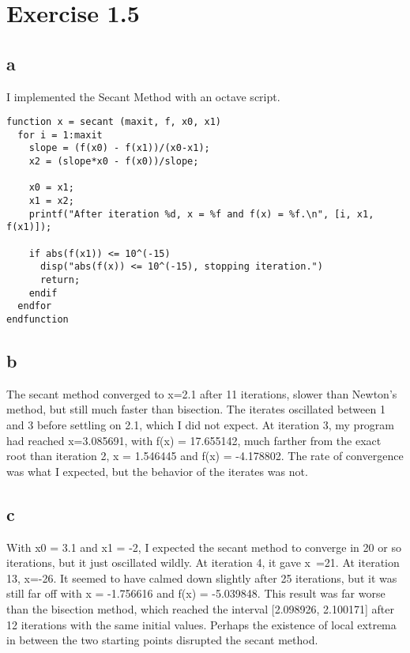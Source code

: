 \documentclass[11pt]{amsart}
\begin{document}
   \section{Exercise 1.5}
   \subsection{a}
   I implemented the Secant Method with an octave script.\\
   \begin{verbatim}
function x = secant (maxit, f, x0, x1)
  for i = 1:maxit
    slope = (f(x0) - f(x1))/(x0-x1);
    x2 = (slope*x0 - f(x0))/slope;

    x0 = x1;
    x1 = x2;
    printf("After iteration %d, x = %f and f(x) = %f.\n", [i, x1, f(x1)]);

    if abs(f(x1)) <= 10^(-15)
      disp("abs(f(x)) <= 10^(-15), stopping iteration.")
      return;
    endif
  endfor
endfunction
   \end{verbatim}
   \subsection{b}
   The secant method converged to x=2.1 after 11 iterations, slower than Newton's method, but still much faster than bisection.  The iterates oscillated between 1 and 3 before settling on 2.1, which I did not expect.  At iteration 3, my program had reached x=3.085691, with f(x) = 17.655142, much farther from the exact root than iteration 2, x = 1.546445 and f(x) = -4.178802.  The rate of convergence was what I expected, but the behavior of the iterates was not.
   \subsection{c}
   With x0 = 3.1 and x1 = -2, I expected the secant method to converge in 20 or so iterations, but it just oscillated wildly.  At iteration 4, it gave x~=21.  At iteration 13, x=-26.  It seemed to have calmed down slightly after 25 iterations, but it was still far off with x = -1.756616 and f(x) = -5.039848.  This result was far worse than the bisection method, which reached the interval [2.098926, 2.100171] after 12 iterations with the same initial values.  Perhaps the existence of local extrema in between the two starting points disrupted the secant method.
\end{document}
